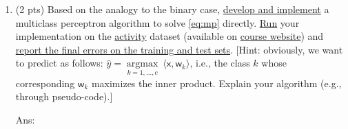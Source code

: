 \documentclass[10pt]{article}
\newcommand{\inner}[2]{\langle #1, #2 \rangle}
\newcommand{\xbs}{\bm{\mathsf{x}}}
\newcommand{\wbs}{\bm{\mathsf{w}}}
\newcommand{\argmax}{\mathop{\mathrm{argmax}}}
\newcommand{\eg}{{e.g.}\xspace}
\newcommand{\ie}{{i.e.}\xspace}
\newcommand{\ans}[1]{{\color{orange}\textsf{Ans}: #1}}
\begin{document}
\begin{exercise}
\begin{enumerate}
	\ans{\vskip3cm
	}
	
	\item (2 pts) Based on the analogy to the binary case, \uline{develop and implement} a multiclass perceptron algorithm to solve \eqref{eq:mp} directly. \uline{Run} your implementation on the \href{https://archive-beta.ics.uci.edu/ml/datasets/human+activity+recognition+using+smartphones}{activity} dataset (available on \href{https://cs.uwaterloo.ca/~y328yu/mycourses/480/assignment.html}{course website}) and \uline{report the final errors on the training and test sets}. [Hint: obviously, we want to predict as follows: $\hat y = \argmax\limits_{k=1, \ldots, c}~ \inner{\xbs}{\wbs_k}$, \ie, the class $k$ whose corresponding $\wbs_k$ maximizes the inner product. Explain your algorithm (\eg, through pseudo-code).]
	
	\ans{\vskip8cm}
	\end{enumerate}
\end{exercise}
\end{document}
